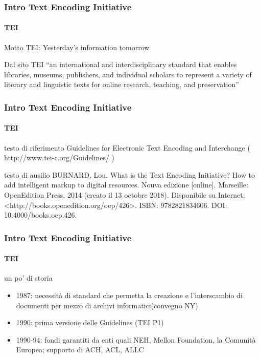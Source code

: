 

\begin{frame}
	\frametitle{Intro Text Encoding Initiative}
	\framesubtitle{TEI}
	\addtocounter{nframe}{1}

	\begin{block}{Motto}
		TEI: Yesterday's information tomorrow
	\end{block}

	\begin{block}{Dal sito TEI}
		“an international and interdisciplinary standard that
		enables libraries, museums, publishers, and individual
		scholars to represent a variety of literary and linguistic
		texts for online research, teaching, and preservation”
	\end{block}
\end{frame}


\begin{frame}
	\frametitle{Intro Text Encoding Initiative}
	\framesubtitle{TEI}
	\addtocounter{nframe}{1}

	\begin{block}{testo di riferimento}
		Guidelines for Electronic Text Encoding and Interchange ( http://www.tei-c.org/Guidelines/ )
	\end{block}

	\begin{block}{testo di ausilio}
		BURNARD, Lou. What is the Text Encoding Initiative? How to add intelligent markup to digital resources. Nouva edizione [online]. Marseille: OpenEdition Press, 2014 (creato il 13 octobre 2018). Disponibile su Internet: <http://books.openedition.org/oep/426>. ISBN: 9782821834606. DOI: 10.4000/books.oep.426.

	\end{block}
\end{frame}


\begin{frame}
	\frametitle{Intro Text Encoding Initiative}
	\framesubtitle{TEI}
	\addtocounter{nframe}{1}

	\begin{block}{un po' di storia}
		\begin{itemize}
			\item 1987: necessità di standard che permetta la creazione e l’interscambio di documenti per mezzo di archivi informatici(convegno NY)
			\item 1990: prima versione delle Guidelines (TEI P1)
			\item 1990-94: fondi garantiti da enti quali NEH, Mellon Foundation, la Comunità Europea; supporto di ACH, ACL, ALLC
		\end{itemize}
	\end{block}

\end{frame}

